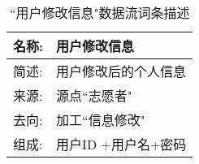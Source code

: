 \begin{table}[H]  
\caption{``用户修改信息"数据流词条描述}  
\begin{center}  
    \begin{tabular}{l p{11cm}} 
        \hline
        \quad 名称:  &   用户修改信息 \\
        \hline
        \quad 简述:  & 用户修改后的个人信息 \\
        \hline
        \quad 来源:  & 源点``志愿者"\\
        \hline
        \quad 去向:  & 加工``信息修改" \\
        \hline
        \quad 组成:  & 用户ID +用户名+密码 \\
        \hline
    \end{tabular}
    \label{tab1}
\end{center}
\end{table}
